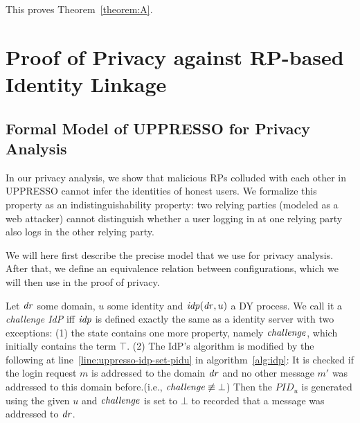   This proves Theorem~\ref{theorem:A}.\QED
  
  \section{Proof of Privacy against RP-based Identity Linkage}
  
  \subsection{Formal Model of UPPRESSO for Privacy Analysis}
  
  In our privacy analysis, we show that malicious RPs colluded 
  with each other in UPPRESSO cannot infer the identities of 
  honest users. We formalize this property as an 
  indistinguishability property: two relying parties (modeled as 
  a web attacker) cannot distinguish whether a user logging in 
  at one relying party also logs in the other relying party.
  
  We will here first describe the precise model that we use for 
  privacy analysis. After that, we define an equivalence 
  relation between configurations, which we will then use in the 
  proof of privacy.
  
  \begin{definition}
    Let $\mathit{dr}$ some domain, $u$ some identity and $\mathit{idp}(\mathit{dr}, u)$ a DY process. 
    We call it a \emph{challenge IdP} iff $\mathit{idp}$ is defined exactly the same as a identity server with two exceptions: 
    (1) the state contains one more property, namely $\mathit{challenge}$, which initially contains the term $\top$. 
    (2) The IdP's algorithm is modified by the following at line~\ref{line:uppresso-idp-set-pidu} in algorithm~\ref{alg:idp}: 
    It is checked if the login request $m$ is addressed to the domain $\mathit{dr}$ and no other message $m'$ was addressed to this domain before.(i.e., $\mathit{challenge} \not\equiv \bot$)
    Then the $PID_u$ is generated using the given $u$ and $\mathit{challenge}$ is set to $\bot$ to recorded that a message was addressed to $\mathit{dr}$. 
  \end{definition}
  
